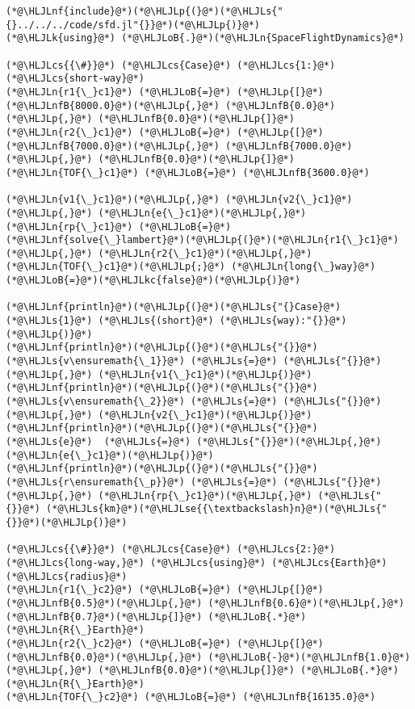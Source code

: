 \documentclass[12pt,a4paper]{article}
\newcommand{\HLJLk}[1]{\textcolor[RGB]{148,91,176}{\textbf{#1}}}
\newcommand{\HLJLkc}[1]{\textcolor[RGB]{59,151,46}{\textit{#1}}}
\newcommand{\HLJLn}[1]{#1}
\newcommand{\HLJLnf}[1]{\textcolor[RGB]{66,102,213}{#1}}
\newcommand{\HLJLs}[1]{\textcolor[RGB]{201,61,57}{#1}}
\newcommand{\HLJLse}[1]{\textcolor[RGB]{59,151,46}{#1}}
\newcommand{\HLJLnfB}[1]{\textcolor[RGB]{59,151,46}{#1}}
\newcommand{\HLJLoB}[1]{\textcolor[RGB]{102,102,102}{\textbf{#1}}}
\newcommand{\HLJLp}[1]{#1}
\newcommand{\HLJLcs}[1]{\textcolor[RGB]{153,153,119}{\textit{#1}}}
\begin{document}
\begin{lstlisting}
(*@\HLJLnf{include}@*)(*@\HLJLp{(}@*)(*@\HLJLs{"{}../../../code/sfd.jl"{}}@*)(*@\HLJLp{)}@*)
(*@\HLJLk{using}@*) (*@\HLJLoB{.}@*)(*@\HLJLn{SpaceFlightDynamics}@*)

(*@\HLJLcs{{\#}}@*) (*@\HLJLcs{Case}@*) (*@\HLJLcs{1:}@*) (*@\HLJLcs{short‐way}@*)
(*@\HLJLn{r1{\_}c1}@*) (*@\HLJLoB{=}@*) (*@\HLJLp{[}@*)(*@\HLJLnfB{8000.0}@*)(*@\HLJLp{,}@*) (*@\HLJLnfB{0.0}@*)(*@\HLJLp{,}@*) (*@\HLJLnfB{0.0}@*)(*@\HLJLp{]}@*)
(*@\HLJLn{r2{\_}c1}@*) (*@\HLJLoB{=}@*) (*@\HLJLp{[}@*)(*@\HLJLnfB{7000.0}@*)(*@\HLJLp{,}@*) (*@\HLJLnfB{7000.0}@*)(*@\HLJLp{,}@*) (*@\HLJLnfB{0.0}@*)(*@\HLJLp{]}@*)
(*@\HLJLn{TOF{\_}c1}@*) (*@\HLJLoB{=}@*) (*@\HLJLnfB{3600.0}@*)

(*@\HLJLn{v1{\_}c1}@*)(*@\HLJLp{,}@*) (*@\HLJLn{v2{\_}c1}@*)(*@\HLJLp{,}@*) (*@\HLJLn{e{\_}c1}@*)(*@\HLJLp{,}@*) (*@\HLJLn{rp{\_}c1}@*) (*@\HLJLoB{=}@*) (*@\HLJLnf{solve{\_}lambert}@*)(*@\HLJLp{(}@*)(*@\HLJLn{r1{\_}c1}@*)(*@\HLJLp{,}@*) (*@\HLJLn{r2{\_}c1}@*)(*@\HLJLp{,}@*) (*@\HLJLn{TOF{\_}c1}@*)(*@\HLJLp{;}@*) (*@\HLJLn{long{\_}way}@*)(*@\HLJLoB{=}@*)(*@\HLJLkc{false}@*)(*@\HLJLp{)}@*)

(*@\HLJLnf{println}@*)(*@\HLJLp{(}@*)(*@\HLJLs{"{}Case}@*) (*@\HLJLs{1}@*) (*@\HLJLs{(short}@*) (*@\HLJLs{way):"{}}@*)(*@\HLJLp{)}@*)
(*@\HLJLnf{println}@*)(*@\HLJLp{(}@*)(*@\HLJLs{"{}}@*)  (*@\HLJLs{v\ensuremath{\_1}}@*) (*@\HLJLs{=}@*) (*@\HLJLs{"{}}@*)(*@\HLJLp{,}@*) (*@\HLJLn{v1{\_}c1}@*)(*@\HLJLp{)}@*)
(*@\HLJLnf{println}@*)(*@\HLJLp{(}@*)(*@\HLJLs{"{}}@*)  (*@\HLJLs{v\ensuremath{\_2}}@*) (*@\HLJLs{=}@*) (*@\HLJLs{"{}}@*)(*@\HLJLp{,}@*) (*@\HLJLn{v2{\_}c1}@*)(*@\HLJLp{)}@*)
(*@\HLJLnf{println}@*)(*@\HLJLp{(}@*)(*@\HLJLs{"{}}@*)  (*@\HLJLs{e}@*)  (*@\HLJLs{=}@*) (*@\HLJLs{"{}}@*)(*@\HLJLp{,}@*) (*@\HLJLn{e{\_}c1}@*)(*@\HLJLp{)}@*)
(*@\HLJLnf{println}@*)(*@\HLJLp{(}@*)(*@\HLJLs{"{}}@*)  (*@\HLJLs{r\ensuremath{\_p}}@*) (*@\HLJLs{=}@*) (*@\HLJLs{"{}}@*)(*@\HLJLp{,}@*) (*@\HLJLn{rp{\_}c1}@*)(*@\HLJLp{,}@*) (*@\HLJLs{"{}}@*) (*@\HLJLs{km}@*)(*@\HLJLse{{\textbackslash}n}@*)(*@\HLJLs{"{}}@*)(*@\HLJLp{)}@*)

(*@\HLJLcs{{\#}}@*) (*@\HLJLcs{Case}@*) (*@\HLJLcs{2:}@*) (*@\HLJLcs{long‐way,}@*) (*@\HLJLcs{using}@*) (*@\HLJLcs{Earth}@*) (*@\HLJLcs{radius}@*)
(*@\HLJLn{r1{\_}c2}@*) (*@\HLJLoB{=}@*) (*@\HLJLp{[}@*)(*@\HLJLnfB{0.5}@*)(*@\HLJLp{,}@*) (*@\HLJLnfB{0.6}@*)(*@\HLJLp{,}@*) (*@\HLJLnfB{0.7}@*)(*@\HLJLp{]}@*) (*@\HLJLoB{.*}@*) (*@\HLJLn{R{\_}Earth}@*)
(*@\HLJLn{r2{\_}c2}@*) (*@\HLJLoB{=}@*) (*@\HLJLp{[}@*)(*@\HLJLnfB{0.0}@*)(*@\HLJLp{,}@*) (*@\HLJLoB{-}@*)(*@\HLJLnfB{1.0}@*)(*@\HLJLp{,}@*) (*@\HLJLnfB{0.0}@*)(*@\HLJLp{]}@*) (*@\HLJLoB{.*}@*) (*@\HLJLn{R{\_}Earth}@*)
(*@\HLJLn{TOF{\_}c2}@*) (*@\HLJLoB{=}@*) (*@\HLJLnfB{16135.0}@*)


\end{lstlisting}
\end{document}
